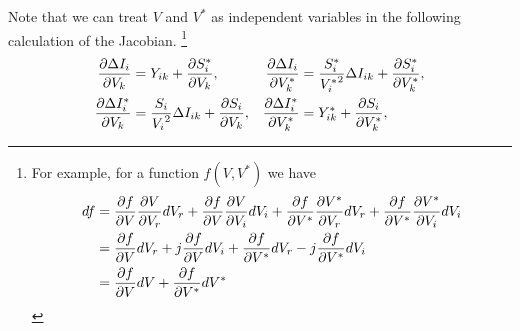 \documentclass[11pt]{article}
\begin{document}
Note that we can treat $V$ and $V^*$ as independent variables in the following calculation of the Jacobian. 
\footnote{
	For example, for a function $f(V, V^*)$ we have
	\begin{align}
	df &= \frac{\partial f}{\partial V} \frac{\partial V}{\partial V_r}dV_r  +  \frac{\partial f}{\partial V} \frac{\partial V}{\partial V_i}dV_i +  \frac{\partial f}{\partial V^*} \frac{\partial V^*}{\partial V_r}dV_r  + \frac{\partial f}{\partial V^*} \frac{\partial V^*}{\partial V_i}dV_i \notag \\
	&= \frac{\partial f}{\partial V} dV_r  + j\frac{\partial f}{\partial V}dV_i +  \frac{\partial f}{\partial V^*}dV_r  - j\frac{\partial f}{\partial V^*} dV_i \notag \\
	&= \frac{\partial f}{\partial V} dV +  \frac{\partial f}{\partial V^*}dV^* \notag
	\end{align}
}
\begin{align}
\frac{\partial \Delta I_i}{\partial V_k} &= Y_{ik} + \frac{\partial S^*_i}{\partial V_k}, &\frac{\partial \Delta I_i}{\partial V^*_k} &=  \frac{S^*_i}{{V^*_i}^2}\Delta I_{ik} + \frac{\partial S^*_i}{\partial V^*_k},  \notag \\
\frac{\partial \Delta I^*_i}{\partial V_k} &= \frac{S_i}{{V_i}^2}\Delta I_{ik} + \frac{\partial S_i}{\partial V_k}, &\frac{\partial \Delta I^*_i}{\partial V^*_k} &= Y^*_{ik} + \frac{\partial S_i}{\partial V^*_k},
\end{align}
\end{document}
